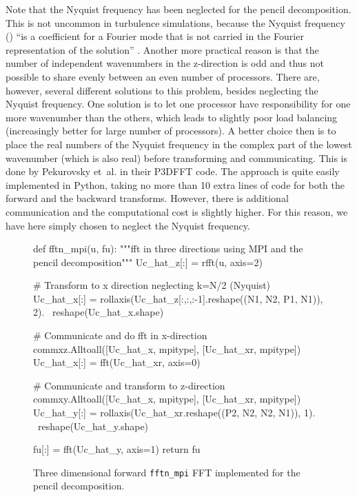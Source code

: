 \documentclass[final,3p,times,twocolumn]{elsarticle}
\newcommand{\inpyth}{\lstinline[style=inlinestyle]}
\begin{document}
Note that the Nyquist frequency has been neglected for the pencil 
decomposition. This is not uncommon in turbulence simulations, because the 
Nyquist frequency () ``is a coefficient for a Fourier mode
that is not carried in the Fourier representation of the solution'' 
\cite{Lee2013}.  Another more practical reason is that the number of 
independent wavenumbers in the z-direction is odd and thus not possible to 
share evenly between an even number of processors. There are, however, several 
different solutions to this problem, besides neglecting the Nyquist frequency. 
One solution is to let one processor have responsibility for one
more wavenumber than the others, which leads to slightly poor load balancing 
(increasingly better for large number of processors). A better choice then is 
to place the real numbers of the Nyquist frequency in the complex part of the 
lowest wavenumber (which is also real) before transforming and communicating. 
This is done by Pekurovsky et~al. \cite{pekurovsky2012} in their P3DFFT code. 
The approach is quite easily implemented in Python, taking no more than 10 
extra lines of code for both the forward and the backward
transforms. However, there is additional communication and the computational 
cost is slightly higher. For this reason, we have here simply chosen to neglect 
the Nyquist frequency.

\begin{figure*}
\begin{python}
def fftn_mpi(u, fu):
    """fft in three directions using MPI and the pencil decomposition"""
    Uc_hat_z[:] = rfft(u, axis=2)

    # Transform to x direction neglecting k=N/2 (Nyquist)
    Uc_hat_x[:] = rollaxis(Uc_hat_z[:,:,:-1].reshape((N1, N2, P1, N1)), 2). \
                                             reshape(Uc_hat_x.shape)

    # Communicate and do fft in x-direction
    commxz.Alltoall([Uc_hat_x, mpitype], [Uc_hat_xr, mpitype])
    Uc_hat_x[:] = fft(Uc_hat_xr, axis=0)

    # Communicate and transform to z-direction
    commxy.Alltoall([Uc_hat_x, mpitype], [Uc_hat_xr, mpitype])
    Uc_hat_y[:] = rollaxis(Uc_hat_xr.reshape((P2, N2, N2, N1)), 1). \
                                     reshape(Uc_hat_y.shape)

    fu[:] = fft(Uc_hat_y, axis=1)
    return fu
\end{python}
\caption{Three dimensional forward \inpyth{fftn_mpi}  FFT implemented for the 
pencil decomposition.}
\label{fig:fftn_pencil}
\end{figure*}
\end{document}
